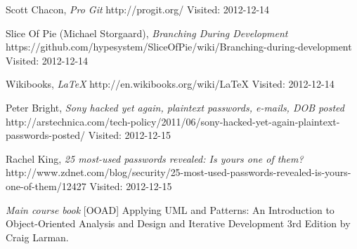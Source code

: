 \begin{thebibliography}{99}
        Scott Chacon,
        \emph{Pro Git}\newline
        http://progit.org/\newline
        Visited: 2012-12-14
        
        Slice Of Pie (Michael Storgaard),
        \emph{Branching During Development}\newline
        https://github.com/hypesystem/SliceOfPie/wiki/Branching-during-development\newline
        Visited: 2012-12-14
        
        Wikibooks,
        \emph{\LaTeX}\newline
        http://en.wikibooks.org/wiki/LaTeX\newline
        Visited: 2012-12-14
        
        Peter Bright,
        \emph{Sony hacked yet again, plaintext passwords, e-mails, DOB posted}\newline
        http://arstechnica.com/tech-policy/2011/06/sony-hacked-yet-again-plaintext-passwords-posted/\newline
        Visited: 2012-12-15
    
        Rachel King,
        \emph{25 most-used passwords revealed: Is yours one of them?}\newline
        http://www.zdnet.com/blog/security/25-most-used-passwords-revealed-is-yours-one-of-them/12427\newline
        Visited: 2012-12-15
        
        	\emph{Main course book}
        	[OOAD] Applying UML and Patterns: An Introduction to Object-Oriented Analysis and Design and Iterative Development 3rd Edition by Craig Larman.
        	
\end{thebibliography}